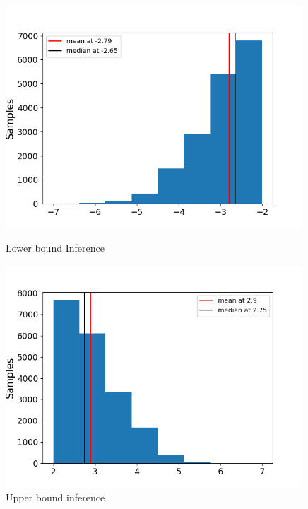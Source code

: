 \documentclass[a4paper,11pt]{article}
\theoremstyle{mytheor}
\begin{document}
\begin{figure}[H]
    \centering
    \begin{minipage}{0.49\textwidth}
        \centering
        \includegraphics[width=0.99\textwidth]{data/lower_boundc.png} %
        \caption{Lower bound Inference}
        \label{fig:lb}
    \end{minipage}
    \begin{minipage}{0.49\textwidth}
        \centering
        \includegraphics[width=0.99\textwidth]{data/upper_boundc.png} %
        \caption{Upper bound inference}
        \label{fig:ub}
    \end{minipage}
    
\end{figure}
\end{document}
